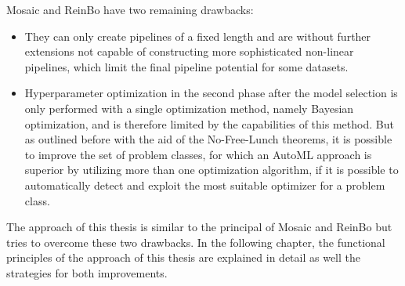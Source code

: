Mosaic and ReinBo have two remaining drawbacks:
\begin{itemize}
    \item They can only create pipelines of a fixed length and are without further extensions not capable of constructing more sophisticated non-linear pipelines, which limit the final pipeline potential for some datasets.
    \item Hyperparameter optimization in the second phase after the model selection is only performed with a single optimization method, namely Bayesian optimization, and is therefore limited by the capabilities of this method.
    But as outlined before with the aid of the No-Free-Lunch theorems, it is possible to improve the set of problem classes, for which an AutoML approach is superior by utilizing more than one optimization algorithm, if it is possible to automatically detect and exploit the most suitable optimizer for a problem class.
\end{itemize}
The approach of this thesis is similar to the principal of Mosaic and ReinBo but tries to overcome these two drawbacks.
In the following chapter, the functional principles of the approach of this thesis are explained in detail as well the strategies for both improvements.
